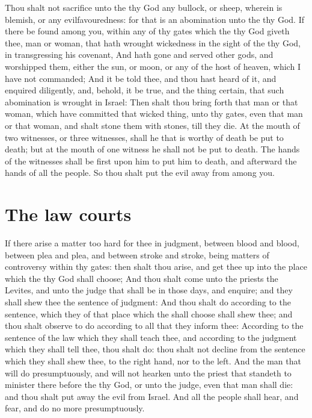 \begin{biblechapter} %
\verse Thou shalt not sacrifice unto the \LORD thy God any bullock, or sheep, wherein is blemish, or any evilfavouredness: for that is an abomination unto the \LORD thy God.
\verse If there be found among you, within any of thy gates which the \LORD thy God giveth thee, man or woman, that hath wrought wickedness in the sight of the \LORD thy God, in transgressing his covenant,
\verse And hath gone and served other gods, and worshipped them, either the sun, or moon, or any of the host of heaven, which I have not commanded;
\verse And it be told thee, and thou hast heard of it, and enquired diligently, and, behold, it be true, and the thing certain, that such abomination is wrought in Israel:
\verse Then shalt thou bring forth that man or that woman, which have committed that wicked thing, unto thy gates, even that man or that woman, and shalt stone them with stones, till they die.
\verse At the mouth of two witnesses, or three witnesses, shall he that is worthy of death be put to death; but at the mouth of one witness he shall not be put to death.
\verse The hands of the witnesses shall be first upon him to put him to death, and afterward the hands of all the people. So thou shalt put the evil away from among you.
\section*{The law courts}
\verse If there arise a matter too hard for thee in judgment, between blood and blood, between plea and plea, and between stroke and stroke, being matters of controversy within thy gates: then shalt thou arise, and get thee up into the place which the \LORD thy God shall choose;
\verse And thou shalt come unto the priests the Levites, and unto the judge that shall be in those days, and enquire; and they shall shew thee the sentence of judgment:
\verse And thou shalt do according to the sentence, which they of that place which the \LORD shall choose shall shew thee; and thou shalt observe to do according to all that they inform thee:
\verse According to the sentence of the law which they shall teach thee, and according to the judgment which they shall tell thee, thou shalt do: thou shalt not decline from the sentence which they shall shew thee, to the right hand, nor to the left.
\verse And the man that will do presumptuously, and will not hearken unto the priest that standeth to minister there before the \LORD thy God, or unto the judge, even that man shall die: and thou shalt put away the evil from Israel.
\verse And all the people shall hear, and fear, and do no more presumptuously.

\end{biblechapter}
